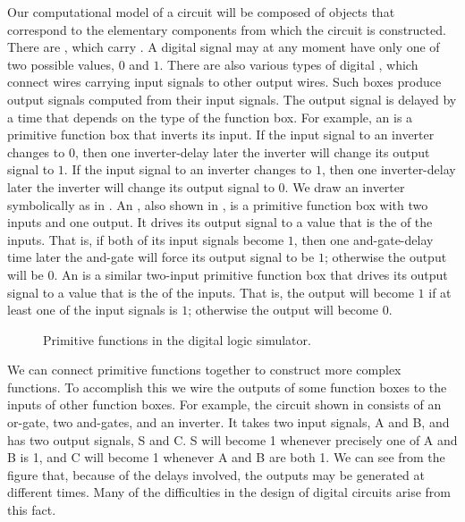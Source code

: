 Our computational model of a circuit will be composed of objects that correspond to the elementary components from which the circuit is constructed.
There are , which carry .
A digital signal may at any moment have only one of two possible values, \( 0 \) and \( 1 \).
There are also various types of digital , which connect wires carrying input signals to other output wires.
Such boxes produce output signals computed from their input signals.
The output signal is delayed by a time that depends on the type of the function box.
For example, an  is a primitive function box that inverts its input.
If the input signal to an inverter changes to \( 0 \), then one inverter-delay later the inverter will change its output signal to \( 1 \).
If the input signal to an inverter changes to \( 1 \), then one inverter-delay later the inverter will change its output signal to \( 0 \).
We draw an inverter symbolically as in .
An , also shown in , is a primitive function box with two inputs and one output.
It drives its output signal to a value that is the  of the inputs.
That is, if both of its input signals become \( 1 \), then one and-gate-delay time later the and-gate will force its output signal to be \( 1 \);
otherwise the output will be \( 0 \).
An  is a similar two-input primitive function box that drives its output signal to a value that is the  of the inputs.
That is, the output will become \( 1 \) if at least one of the input signals is \( 1 \);
otherwise the output will become \( 0 \).

\begin{figure}[tb]
	\centering
	
	\caption{
		Primitive functions in the digital logic simulator.
	}
	\label{Figure 3.24}
\end{figure}

We can connect primitive functions together to construct more complex functions.
To accomplish this we wire the outputs of some function boxes to the inputs of other function boxes.
For example, the  circuit shown in  consists of an or-gate, two and-gates, and an inverter.
It takes two input signals, A and B, and has two output signals, S and C.
S will become 1 whenever precisely one of A and B is 1, and C will become 1 whenever A and B are both 1.
We can see from the figure that, because of the delays involved, the outputs may be generated at different times.
Many of the difficulties in the design of digital circuits arise from this fact.

